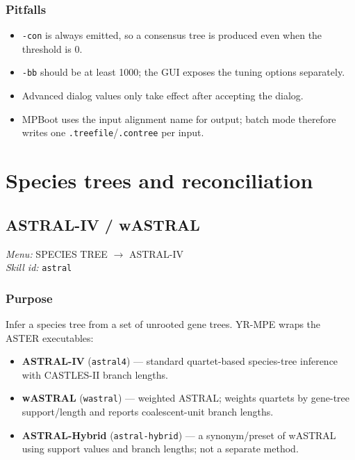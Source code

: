 \documentclass[11pt]{report}
\begin{document}
\subsection{Pitfalls}

\begin{itemize}
  \item \texttt{-con} is always emitted, so a consensus tree is produced even when the threshold is 0.
  \item \texttt{-bb} should be at least 1000; the GUI exposes the tuning options separately.
  \item Advanced dialog values only take effect after accepting the dialog.
  \item MPBoot uses the input alignment name for output; batch mode therefore writes one \texttt{.\allowbreak treefile}/\texttt{.\allowbreak contree} per input.
\end{itemize}


\chapter{Species trees and reconciliation}
\section{ASTRAL-IV / wASTRAL}
\noindent\textit{Menu:} SPECIES TREE $\rightarrow$ ASTRAL-IV\\
\noindent\textit{Skill id:} \texttt{astral}

\subsection{Purpose}

Infer a species tree from a set of unrooted gene trees. YR-MPE wraps the ASTER executables:

\begin{itemize}
  \item \textbf{ASTRAL-IV} (\texttt{astral4}) --- standard quartet-based species-tree inference with CASTLES-II branch lengths.
  \item \textbf{wASTRAL} (\texttt{wastral}) --- weighted ASTRAL; weights quartets by gene-tree support/length and reports coalescent-unit branch lengths.
  \item \textbf{ASTRAL-Hybrid} (\texttt{astral-hybrid}) --- a synonym/preset of wASTRAL using support values and branch lengths; not a separate method.
\end{itemize}
\end{document}

